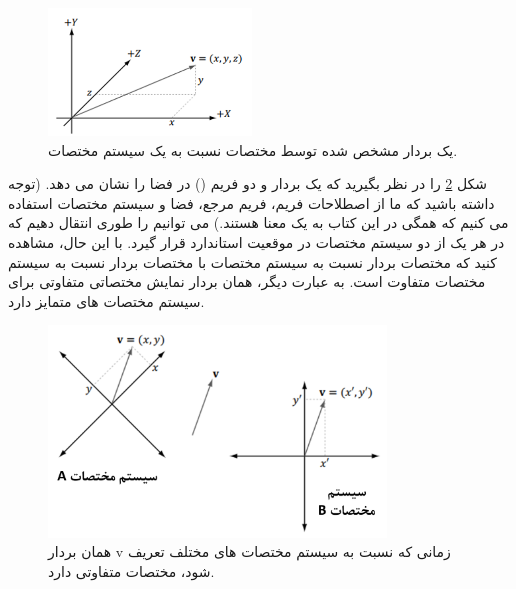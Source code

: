 {\begin{spacing}{1.5}
        \begin{figure}[H]
            \centering
            \setlength{\belowcaptionskip}{-10pt}
            \includegraphics[width=0.48\textwidth]{Images/4/4.Session.1.1.3}
            \caption{یک بردار مشخص شده توسط مختصات نسبت به یک سیستم مختصات.}
            \label{fig:4.Session.1.1.3}
        \end{figure}

        شکل \ref{fig:4.Session.1.1.4} را در نظر بگیرید که یک بردار  و دو فریم () در فضا را نشان می دهد. (توجه داشته باشید که ما از اصطلاحات فریم، فریم مرجع، فضا و سیستم مختصات استفاده می کنیم که همگی در این کتاب به یک معنا هستند.)
        می توانیم  را طوری انتقال دهیم که در هر یک از دو سیستم مختصات در موقعیت استاندارد قرار گیرد. با این حال، مشاهده کنید که مختصات بردار  نسبت به سیستم مختصات  با مختصات بردار  نسبت به سیستم مختصات  متفاوت است.
        به عبارت دیگر، همان بردار  نمایش مختصاتی متفاوتی برای سیستم مختصات های متمایز دارد.

        \begin{figure}[H]
            \centering
            \setlength{\belowcaptionskip}{-10pt}
            \includegraphics[width=0.8\textwidth]{Images/4/4.Session.1.1.4}
            \caption{همان بردار v زمانی که نسبت به سیستم مختصات های مختلف تعریف شود، مختصات متفاوتی دارد.}
            \label{fig:4.Session.1.1.4}
        \end{figure}


\end{spacing}}
